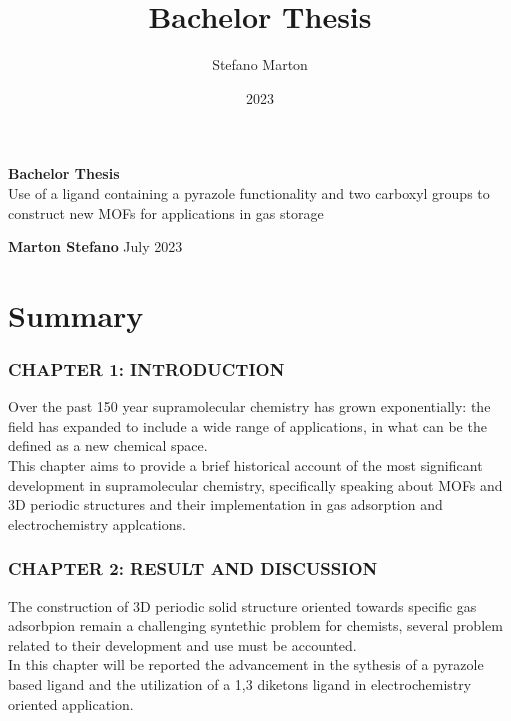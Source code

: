 \documentclass[a4,11pt]{report}
\title{Bachelor Thesis}
\author{Stefano Marton}
\date{2023}
\begin{document}
\begin{titlepage}
	\begin{center}
		\vspace*{6cm}
		\Huge
		\textbf{Bachelor Thesis}\\
		\vspace{0.5cm}
		\LARGE
		\vspace{1.5cm}
		Use of a ligand containing a pyrazole functionality and two carboxyl groups to construct new MOFs for applications in gas storage

		\vspace{1.5cm}
		\textbf{Marton Stefano}
		\vfill
		July 2023
		\vspace{0.8cm}
	\end{center}
\end{titlepage}
\vspace{1cm}

\chapter*{Summary}

\subsection*{CHAPTER 1: INTRODUCTION}

Over the past 150 year supramolecular chemistry has grown exponentially: the field has expanded to include a wide range of applications, in what can be the defined as a new chemical space.\\
This chapter aims to provide a brief historical account of the most significant development in supramolecular chemistry, specifically speaking about MOFs and 3D periodic structures and their implementation in gas adsorption and electrochemistry applcations.

\newline\subsection*{CHAPTER 2: RESULT AND DISCUSSION}

The construction of 3D periodic solid structure oriented towards specific gas adsorbpion remain a challenging syntethic problem for chemists, several problem related to their development and use must be accounted.\\
In this chapter will be reported the advancement in the sythesis of a pyrazole based ligand and the utilization of a 1,3 diketons ligand in electrochemistry oriented application.
\end{document}
